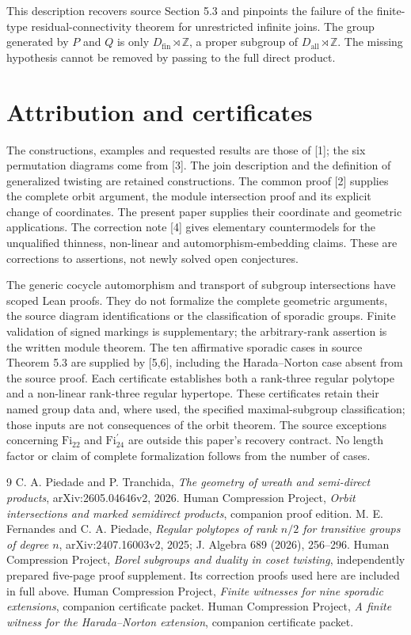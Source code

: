 This description recovers source Section 5.3 and pinpoints the failure
of the finite-type residual-connectivity theorem for unrestricted
infinite joins. The group generated by $P$ and $Q$ is only
$D_{\mathrm{fin}}\rtimes\mathbb Z$, a proper subgroup of
$D_{\mathrm{all}}\rtimes\mathbb Z$. The missing hypothesis cannot
be removed by passing to the full direct product.

\section{Attribution and certificates}
The constructions, examples and requested results are those of [1];
the six permutation diagrams come from [3]. The join description and
the definition of generalized twisting are retained constructions.
The common proof [2] supplies the complete orbit argument, the module
intersection proof and its explicit change of coordinates. The present
paper supplies their coordinate and geometric applications. The
correction note [4] gives elementary countermodels for the unqualified
thinness, non-linear and automorphism-embedding claims. These are
corrections to assertions, not newly solved open conjectures.

The generic cocycle automorphism and transport of subgroup intersections
have scoped Lean proofs. They do not formalize the complete geometric
arguments, the source diagram identifications or the classification of
sporadic groups. Finite validation of signed markings is supplementary;
the arbitrary-rank assertion is the written module theorem. The ten
affirmative sporadic cases in source Theorem 5.3 are supplied by [5,6],
including the Harada--Norton case absent from the source proof. Each
certificate establishes both a rank-three regular polytope and a
non-linear rank-three regular hypertope. These certificates retain their
named group data and, where used, the specified maximal-subgroup
classification; those inputs are not consequences of the orbit theorem.
The source exceptions concerning $\mathrm{Fi}_{22}$ and
$\mathrm{Fi}_{24}^{\prime}$ are outside this paper's recovery contract.
No length factor or claim of complete formalization follows from the
number of cases.

\begin{thebibliography}{9}
 C. A. Piedade and P. Tranchida, \emph{The geometry of wreath and semi-direct products}, arXiv:2605.04646v2, 2026.
 Human Compression Project, \emph{Orbit intersections and marked semidirect products}, companion proof edition.
 M. E. Fernandes and C. A. Piedade, \emph{Regular polytopes of rank $n/2$ for transitive groups of degree $n$}, arXiv:2407.16003v2, 2025; J. Algebra 689 (2026), 256--296.
 Human Compression Project, \emph{Borel subgroups and duality in coset twisting}, independently prepared five-page proof supplement. Its correction proofs used here are included in full above.
 Human Compression Project, \emph{Finite witnesses for nine sporadic extensions}, companion certificate packet.
 Human Compression Project, \emph{A finite witness for the Harada--Norton extension}, companion certificate packet.
\end{thebibliography}

